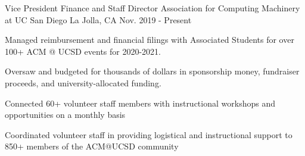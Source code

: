 

\begin{cventries}


  \cventry
    {Vice President Finance and Staff Director} %
    {Association for Computing Machinery at UC San Diego} %
    {La Jolla, CA} %
    {Nov. 2019 - Present} %
    {
      \begin{cvitems} %
        \item {Managed reimbursement and financial filings with Associated Students for over 100+ ACM @ UCSD events for 2020-2021.}
        \item {Oversaw and budgeted for thousands of dollars in sponsorship money, fundraiser proceeds, and university-allocated funding.}
        \item {Connected 60+ volunteer staff members with instructional workshops and opportunities on a monthly basis}
        \item {Coordinated volunteer staff in providing logistical and instructional support to 850+ members of the ACM@UCSD community}
      \end{cvitems}
    }


\end{cventries}
